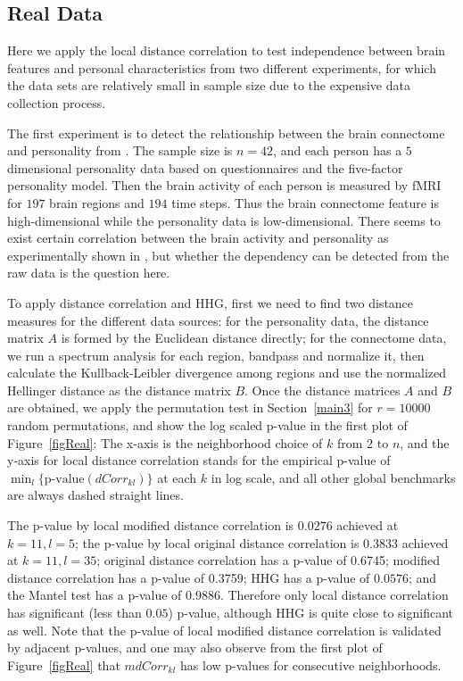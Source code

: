 \documentclass[11pt]{article}
\begin{document}
\subsection{Real Data}
\label{numer2}
Here we apply the local distance correlation to test independence between brain features and personal characteristics from two different experiments, for which the data sets are relatively small in sample size due to the expensive data collection process. 

The first experiment is to detect the relationship between the brain connectome and personality from \cite{AdelsteinEtAl2011}. The sample size is $n=42$, and each person has a $5$ dimensional personality data based on questionnaires and the five-factor personality model. Then the brain activity of each person is measured by fMRI for $197$ brain regions and $194$ time steps. Thus the brain connectome feature is high-dimensional while the personality data is low-dimensional. There seems to exist certain correlation between the brain activity and personality as experimentally shown in \cite{AdelsteinEtAl2011}, but whether the dependency can be detected from the raw data is the question here.

To apply distance correlation and HHG, first we need to find two distance measures for the different data sources: for the personality data, the distance matrix $A$ is formed by the Euclidean distance directly; for the connectome data, we run a spectrum analysis for each region, bandpass and normalize it, then calculate the Kullback-Leibler divergence among regions and use the normalized Hellinger distance as the distance matrix $B$. Once the distance matrices $A$ and $B$ are obtained, we apply the permutation test in Section~\ref{main3} for $r=10000$ random permutations, and show the log scaled p-value in the first plot of Figure~\ref{figReal}: The x-axis is the neighborhood choice of $k$ from $2$ to $n$, and the y-axis for local distance correlation stands for the empirical p-value of $\min_{l} \{\mbox{p-value}(dCorr_{kl})\}$ at each $k$ in log scale, and all other global benchmarks are always dashed straight lines.

The p-value by local modified distance correlation is $0.0276$ achieved at $k=11, l=5$; the p-value by local original distance correlation is $0.3833$ achieved at $k=11, l=35$; original distance correlation has a p-value of 0.6745; modified distance correlation has a p-value of 0.3759; HHG has a p-value of $0.0576$; and the Mantel test has a p-value of $0.9886$. Therefore only local distance correlation has significant (less than $0.05$) p-value, although HHG is quite close to significant as well. Note that the p-value of local modified distance correlation is validated by adjacent p-values, and one may also observe from the first plot of Figure~\ref{figReal} that $mdCorr_{kl}$ has low p-values for consecutive neighborhoods.
\end{document}
